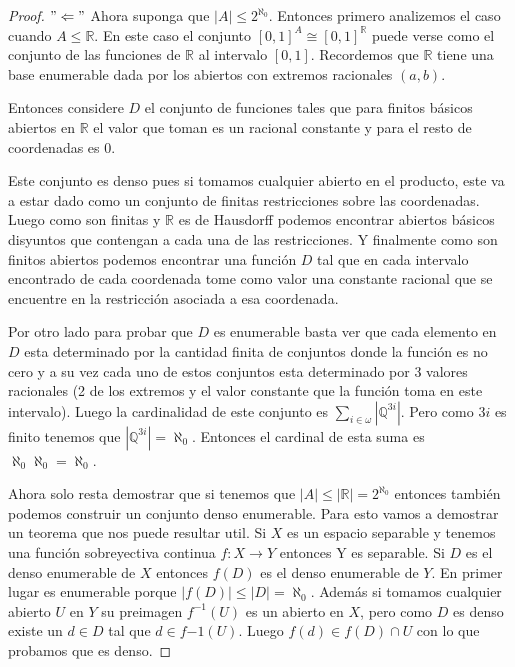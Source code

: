 \documentclass[paper=letter, fontsize=11pt]{scrartcl} %
\numberwithin{equation}{section} %
\numberwithin{figure}{section} %
\numberwithin{table}{section} %
\begin{document}
\begin{enumerate}
\begin{proof}
$ "\Leftarrow" $ Ahora suponga que $ |A| \leq 2^{\aleph_0} $. Entonces primero analizemos el caso cuando $ A \leq \mathbb{R} $. En este caso el conjunto $ [0,1]^A \cong [0,1]^\mathbb{R} $ puede verse como el conjunto de las funciones de $ \mathbb{R} $ al intervalo  $ [0,1] $. Recordemos que $ \mathbb{R} $ tiene una base enumerable dada por los abiertos con extremos racionales $ (a,b) $.

Entonces considere $ D $ el conjunto de funciones tales que para finitos básicos abiertos en $ \mathbb{R} $ el valor que toman es un racional constante y para el resto de coordenadas es 0.

Este conjunto es denso pues si tomamos cualquier abierto en el producto, este va a estar dado como un conjunto de finitas restricciones sobre las coordenadas. Luego como son finitas y $ \mathbb{R} $ es de Hausdorff podemos encontrar abiertos básicos disyuntos que contengan a cada una de las restricciones. Y finalmente como son finitos abiertos podemos encontrar una función $ D $ tal que en cada intervalo encontrado de cada coordenada tome como valor una constante racional que se encuentre en la restricción asociada a esa coordenada.

Por otro lado para probar que $ D $ es enumerable basta ver que cada elemento en $ D $ esta determinado por la cantidad finita de conjuntos donde la función es no cero y a su vez cada uno de estos conjuntos esta determinado por 3 valores racionales (2 de los extremos y el valor constante que la función toma en este intervalo). Luego la cardinalidad de este conjunto es $ \displaystyle \sum_{i \in \omega} |\mathbb{Q}^{3i}|  $. Pero como $ 3i $ es finito tenemos que $ |\mathbb{Q}^{3i}| = \aleph_0 $. Entonces el cardinal de esta suma es $ \aleph_0\aleph_0 = \aleph_0 $.

Ahora solo resta demostrar que si tenemos que $ |A|\leq |\mathbb{R}|= 2^{\aleph_0} $ entonces también podemos construir un conjunto denso enumerable. Para esto vamos a demostrar un teorema que nos puede resultar util. Si $ X $ es un espacio separable y tenemos una función sobreyectiva continua $ f: X \to Y $ entonces Y es separable. Si $ D $ es el denso enumerable de $ X $ entonces $ f(D) $ es el denso enumerable de $ Y $. En primer lugar es enumerable porque $ |f(D)|\leq |D| = \aleph_0 $. Además si tomamos cualquier abierto $ U $ en $ Y $ su preimagen $ f^{-1}(U) $ es un abierto en $ X $, pero como $ D $ es denso existe un $ d \in D $ tal que $ d \in f{-1}(U) $. Luego $ f(d) \in f(D) \cap U $ con lo que probamos que es denso.


\end{proof}
\end{enumerate}
\end{document}
